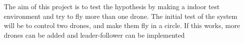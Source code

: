 The aim of this project is to test the hypothesis by making a indoor test environment and try to fly more than one drone. The initial test of the system will be to control two drones, and make them fly in a circle. If this works, more drones can be added and leader-follower can be implemented